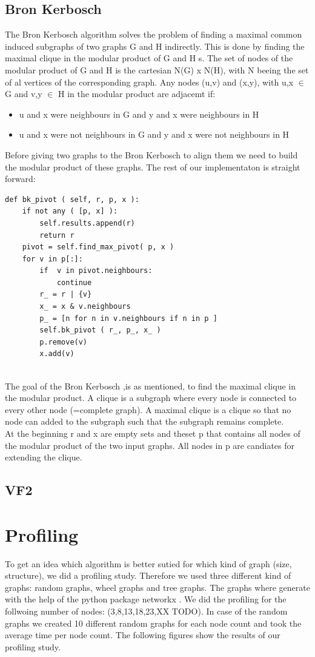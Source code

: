 \documentclass{SeminarV2}
\begin{document}
\subsection{Bron Kerbosch}
The Bron Kerbosch algorithm solves the problem of finding a maximal common induced subgraphs of two graphs G and H indirectly. This is done by finding the maximal clique in the modular product of G and H s. The set of nodes of the modular product of G and H  is the cartesian N(G) x N(H), with N beeing the set of al vertices of the corresponding graph. Any nodes (u,v) and (x,y), with u,x $\in$ G and v,y $\in$ H in the modular product are adjacemt if:
\begin{itemize}
	\item u and x were neighbours in G and y and x were neighbours in H
	\item u and x were not neighbours in G and y and x were not neighbours in H
\end{itemize}
Before giving two graphs to the Bron Kerbosch to align them we need to build the modular product of these graphs. The rest of our implementaton is straight forward:
\begin{Verbatim}
def bk_pivot ( self, r, p, x ):
	if not any ( [p, x] ):
		self.results.append(r)
		return r
	pivot = self.find_max_pivot( p, x )
	for v in p[:]:
		if  v in pivot.neighbours:
			continue
		r_ = r | {v}
		x_ = x & v.neighbours
		p_ = [n for n in v.neighbours if n in p ]
		self.bk_pivot ( r_, p_, x_ )
		p.remove(v)
		x.add(v)


\end{Verbatim}
The goal of the Bron Kerbosch ,is as mentioned, to find the maximal clique in the modular product. A clique is a subgraph where every node is connected to every other node (=complete graph). A maximal clique is a clique so that no node can added to the subgraph such that the subgraph remains complete.\\
At the beginning r and x are empty sets and theset p that contains all nodes of the modular product of the two input graphs. All nodes in p are candiates for extending the clique.

\subsection{VF2}
\section{Profiling}
To get an idea which algorithm is better sutied for which kind of graph (size, structure),
we did a profiling study. Therefore we used three different kind of graphs:
random graphs, wheel graphs and tree graphs. The graphs where generate with the help of
the python package networkx \cite{}. We did the profiling for the follwoing number of nodes:
(3,8,13,18,23,XX TODO).
In case of the random graphs we created 10 different random graphs for each node count and took the average time per node count. The following figures show the results of our profiling study.
\end{document}
